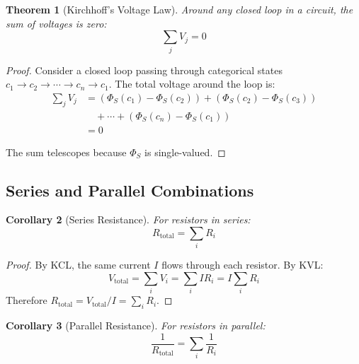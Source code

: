 \documentclass[twocolumn,showpacs,preprintnumbers,amsmath,amssymb,prd]{revtex4-2}
\newtheorem{theorem}{Theorem}[section]
\newtheorem{corollary}[theorem]{Corollary}
\begin{document}
\begin{theorem}[Kirchhoff's Voltage Law]
\label{thm:kvl}
Around any closed loop in a circuit, the sum of voltages is zero:
\begin{equation}
\sum_j V_j = 0
\label{eq:kvl}
\end{equation}
\end{theorem}

\begin{proof}
Consider a closed loop passing through categorical states $c_1 \to c_2 \to \cdots \to c_n \to c_1$. The total voltage around the loop is:
\begin{align}
\sum_j V_j &= (\Phi_S(c_1) - \Phi_S(c_2)) + (\Phi_S(c_2) - \Phi_S(c_3)) \nonumber\\
&\quad + \cdots + (\Phi_S(c_n) - \Phi_S(c_1)) \nonumber\\
&= 0
\label{eq:kvl_proof}
\end{align}

The sum telescopes because $\Phi_S$ is single-valued.
\end{proof}

\subsection{Series and Parallel Combinations}

\begin{corollary}[Series Resistance]
\label{cor:series}
For resistors in series:
\begin{equation}
R_{\text{total}} = \sum_i R_i
\label{eq:series}
\end{equation}
\end{corollary}

\begin{proof}
By KCL, the same current $I$ flows through each resistor. By KVL:
\begin{equation}
V_{\text{total}} = \sum_i V_i = \sum_i IR_i = I\sum_i R_i
\end{equation}
Therefore $R_{\text{total}} = V_{\text{total}}/I = \sum_i R_i$.
\end{proof}

\begin{corollary}[Parallel Resistance]
\label{cor:parallel}
For resistors in parallel:
\begin{equation}
\frac{1}{R_{\text{total}}} = \sum_i \frac{1}{R_i}
\label{eq:parallel}
\end{equation}
\end{corollary}
\end{document}
